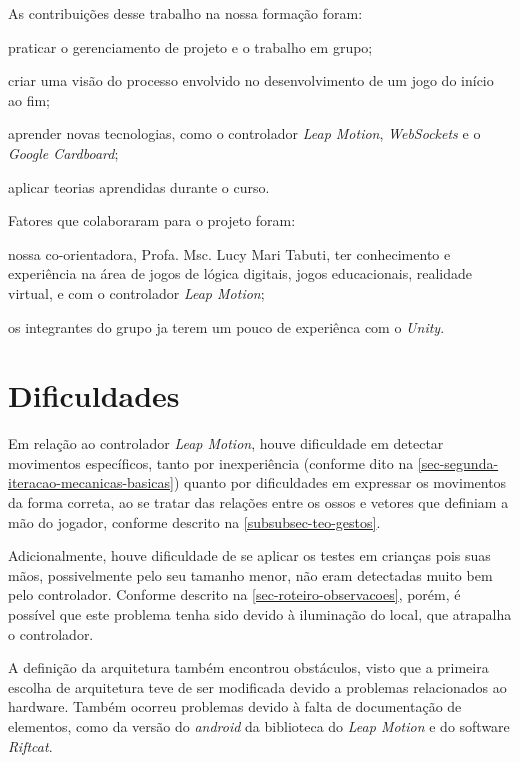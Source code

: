 As contribuições desse trabalho na nossa formação foram:

\begin{alineas}
	\item praticar o gerenciamento de projeto e o trabalho em grupo;
	\item criar uma visão do processo envolvido no desenvolvimento de um jogo do início ao fim;
	\item aprender novas tecnologias, como o controlador \textit{Leap Motion}, \textit{WebSockets} e o \textit{Google Cardboard};
	\item aplicar teorias aprendidas durante o curso.
\end{alineas}

Fatores que colaboraram para o projeto foram:

\begin{alineas}
	\item nossa co-orientadora, Profa. Msc. Lucy Mari Tabuti, ter conhecimento e experiência na área de jogos de lógica digitais, jogos educacionais, realidade virtual, e com o controlador \textit{Leap Motion};
	\item os integrantes do grupo ja terem um pouco de experiênca com o \textit{Unity}.
\end{alineas}

\section{Dificuldades}\label{sec-conc-dificuldades}

Em relação ao controlador \textit{Leap Motion}, houve dificuldade em detectar
movimentos específicos, tanto por inexperiência (conforme dito na
\autoref{sec-segunda-iteracao-mecanicas-basicas}) quanto por dificuldades 
em expressar os movimentos da forma correta, ao se tratar das relações entre 
os ossos e vetores que definiam a mão do jogador, conforme descrito na
\autoref{subsubsec-teo-gestos}.

Adicionalmente, houve dificuldade de se aplicar os testes em crianças pois
suas mãos, possivelmente pelo seu tamanho menor, não eram detectadas muito 
bem pelo controlador. Conforme descrito na 
\autoref{sec-roteiro-observacoes}, porém, é possível que este problema 
tenha sido devido à iluminação do local, que atrapalha o controlador.

A definição da arquitetura também encontrou obstáculos, visto que a 
primeira escolha de arquitetura teve de ser modificada devido 
a problemas relacionados ao hardware. Também ocorreu problemas devido à falta de documentação de elementos, como da versão do \textit{android} da biblioteca do \textit{Leap Motion} e do software \textit{Riftcat}.

